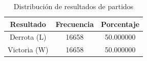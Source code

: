 \begin{table}[H]
\centering
\begin{table}
\caption{Distribución de resultados de partidos}
\label{tab:distribucion_wl}
\begin{tabular}{|c|c|c|}
\toprule
Resultado & Frecuencia & Porcentaje \\
\midrule
Derrota (L) & 16658 & 50.000000 \\
Victoria (W) & 16658 & 50.000000 \\
\bottomrule
\end{tabular}
\end{table}

\end{table}